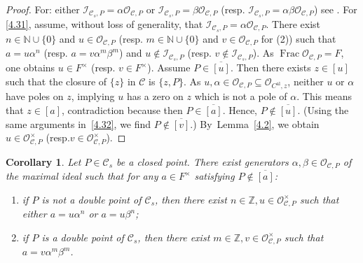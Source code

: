 \documentclass[10pt]{amsart}
\newcommand{\resp}{resp.}
\newcommand{\al}{\mathrm{al}}
\DeclareMathOperator{\Frac}{Frac}
\newtheorem{cor}[thm]{Corollary}
\theoremstyle{definition}
\begin{document}
\begin{proof}
For: either $\mathcal{I}_{\mathcal{C}_s,P}=\alpha \mathcal{O}_{\mathcal{C}, P}$ or $\mathcal{I}_{\mathcal{C}_s,P}=\beta \mathcal{O}_{\mathcal{C}, P}$ (resp. $\mathcal{I}_{\mathcal{C}_s,P}=\alpha \beta\mathcal{O}_{\mathcal{C}, P}$) see \cite[Tag~0BI9]{stacks}. For \eqref{4.31}, assume, without loss of generality, that $\mathcal{I}_{\mathcal{C}_s,P}=\alpha \mathcal{O}_{\mathcal{C}, P}$.
There exist $n \in \mathbb{N} \cup \{0\}$ and $u \in \mathcal{O}_{\mathcal{C}, P}$ (resp. $m \in \mathbb{N} \cup \{0\}$ and $v \in \mathcal{O}_{\mathcal{C}, P}$ for (2)) such that $a=u\alpha^n$ (resp. $a=v\alpha^m \beta^m$) and $u \not \in \mathcal{I}_{\mathcal{C}_s,P}$ (resp. $v \not \in \mathcal{I}_{\mathcal{C}_s,P}$). As $\Frac \mathcal{O}_{\mathcal{C}, P}=F$, one obtains $u \in F^{\times}$ (resp. $v \in F^{\times}$). Assume $P \in \overline{[u]}$. Then there exists $z \in [u]$ such that the closure of $\{z\}$ in $\mathcal{C}$ is $\{z,P\}$. As $u, \alpha \in \mathcal{O}_{\mathcal{C}, P} \subseteq \mathcal{O}_{C^{\al},z}$, neither $u$ or $\alpha$ have poles on $z$, implying $u$ has a zero on $z$ which is not a pole of $\alpha$. This means that $z \in [a]$, contradiction because then $P \in \overline{[a]}$. Hence, $P \not \in \overline{[u]}$. (Using the same arguments in~\eqref{4.32}, we find $P \not \in \overline{[v]}$.) By~Lemma~\ref{4.2}, we obtain $u \in \mathcal{O}_{\mathcal{C},P}^{\times}$ (\resp ${v \in \mathcal{O}_{\mathcal{C}, P}^{\times}}$).
\end{proof}

\begin{cor} \label{4.4}
Let $P \in \mathcal{C}_s$ be a closed point. There exist generators $\alpha, \beta \in \mathcal{O}_{\mathcal{C}, P}$ of the maximal ideal such that for any $a \in F^{\times}$ satisfying $P \not \in \overline{[a]}$:
\begin{enumerate}
\item if $P$ is not a double point of $\mathcal{C}_s$, then there exist $n \in \mathbb{Z}, u \in \mathcal{O}_{\mathcal{C}, P}^{\times}$ such that either $a=u\alpha^n$ or $a=u \beta^n$;
\item if $P$ is a double point of $\mathcal{C}_s$, then there exist $m \in \mathbb{Z}, v \in \mathcal{O}_{\mathcal{C},P}^{\times}$ such that $a=v \alpha^m \beta^m$.
\end{enumerate}
\end{cor}
\end{document}
